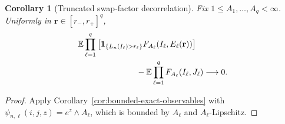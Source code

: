 \documentclass[11pt]{article}
\newcommand{\E}{\mathbb E}
\newcommand{\1}{\mathbf 1}
\newtheorem{corollary}[theorem]{Corollary}
\theoremstyle{definition}
\theoremstyle{remark}
\begin{document}
\begin{corollary}[Truncated swap-factor decorrelation]
\label{cor:truncated-swap-decorrelation}
Fix $1\leq A_1,\dots,A_q<\infty$.  Uniformly in
$\mathbf r\in[r_-,r_+]^q$,
\begin{align}
 &\E\prod_{\ell=1}^q
 \left[
  \1_{\{L_n(I_\ell)>r_\ell\}}
  F_{A_\ell}(I_\ell,E_\ell(\mathbf r))
 \right]
 \nonumber\\
 &\hspace{25mm}
 -\E\prod_{\ell=1}^qF_{A_\ell}(I_\ell,J_\ell)
 \longrightarrow0.
 \label{eq:endpoint-decorrelation}
\end{align}
\end{corollary}

\begin{proof}
Apply Corollary~\ref{cor:bounded-exact-observables} with
$\psi_{n,\ell}(i,j,z)=e^z\wedge A_\ell$, which is bounded by $A_\ell$
and $A_\ell$-Lipschitz.
\end{proof}
\end{document}
